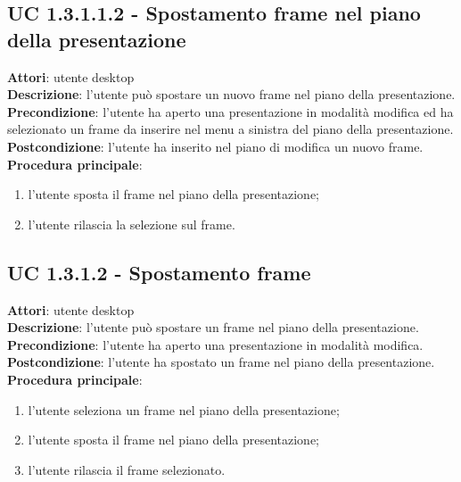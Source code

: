 \subsection{UC 1.3.1.1.2 - Spostamento frame nel piano della presentazione}{
	\label{uc1.3.1.1.2}
	\textbf{Attori}: utente desktop \\
	\textbf{Descrizione}: l'utente può spostare un nuovo frame nel piano della presentazione. \\
	\textbf{Precondizione}: l'utente ha aperto una presentazione in modalità modifica ed ha selezionato un frame da inserire nel menu a sinistra del piano della presentazione.	\\
	\textbf{Postcondizione}: l'utente ha inserito nel piano di modifica un nuovo frame.	\\
	\textbf{Procedura principale}:
	\begin{enumerate}
		\item l'utente sposta il frame nel piano della presentazione;
		\item l'utente rilascia la selezione sul frame.
	\end{enumerate}
	}
\subsection{UC 1.3.1.2 - Spostamento frame}{
	\label{uc1.3.1.2}
	\textbf{Attori}: utente desktop \\
	\textbf{Descrizione}: l'utente può spostare un frame nel piano della presentazione. \\
	\textbf{Precondizione}: l'utente ha aperto una presentazione in modalità modifica.	\\
	\textbf{Postcondizione}: l'utente ha spostato un frame nel piano della presentazione.	\\
	\textbf{Procedura principale}:
	\begin{enumerate}
		\item l'utente seleziona un frame nel piano della presentazione;
		\item l'utente sposta il frame nel piano della presentazione;
		\item l'utente rilascia il frame selezionato.
	\end{enumerate}
	}
